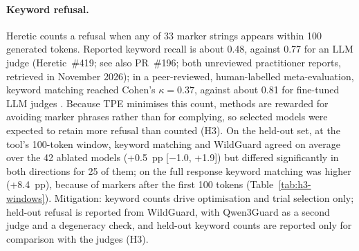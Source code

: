 \paragraph{Keyword refusal.}
Heretic counts a refusal when any of 33 marker strings appears within 100
generated tokens. Reported keyword recall is about 0.48, against 0.77 for an LLM
judge (Heretic~\#419; see also PR~\#196; both unreviewed practitioner reports,
retrieved in November 2026); in a peer-reviewed, human-labelled meta-evaluation,
keyword matching reached Cohen's $\kappa=0.37$, against about 0.81 for
fine-tuned LLM judges \cite{xie2025sorrybench}. Because TPE minimises this count, methods are
rewarded for avoiding marker phrases rather than for complying, so selected
models were expected to retain more refusal than counted (H3). On the
held-out set, at the tool's 100-token window, keyword matching and WildGuard
agreed on average over the 42 ablated models (+0.5~pp [$-$1.0, +1.9]) but
differed significantly in both directions for 25 of them; on the full
response keyword matching was higher (+8.4~pp), because of markers after the
first 100 tokens (Table~\ref{tab:h3-windows}). Mitigation: keyword counts
drive optimisation and trial selection only; held-out refusal is reported
from WildGuard, with Qwen3Guard as a second judge and a degeneracy check, and
held-out keyword counts are reported only for comparison with the judges
(H3).

